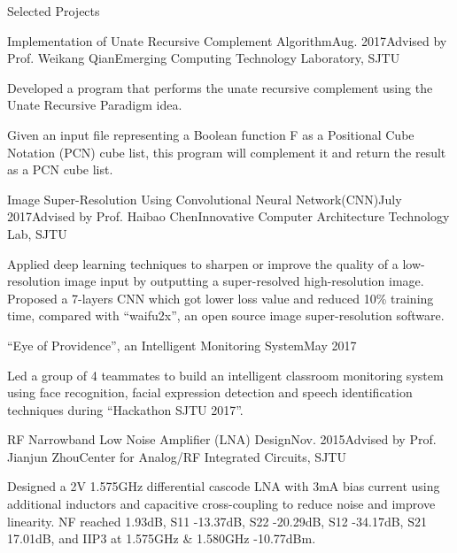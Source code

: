 \documentclass{resume_Stanford} %
\begin{document}
\begin{rSection}{Selected Projects}
\begin{rSubsection}{Implementation of Unate Recursive Complement Algorithm}{Aug. 2017}{Advised by Prof. Weikang Qian}{Emerging Computing Technology Laboratory, SJTU}
\item Developed a program that performs the unate recursive complement using the Unate Recursive Paradigm idea.
\item Given an input file representing a Boolean function F as a Positional Cube Notation (PCN) cube list, this program will complement it and return the result as a PCN cube list.
\end{rSubsection}

\begin{comment}
\begin{rSubsection}{Reading Combinational Circuit and Evaluating Its Outputs}{July 2017}{Advised by Prof. Weikang Qian}{Emerging Computing Technology Laboratory, SJTU}
\item Designed a software tool which can read "bench" format file describing a combinational circuit and implemented a topological sorting algorithm to calculate the values for all the primary outputs of the circuits.
\end{rSubsection}
\end{comment}

\begin{rSubsection}{Image Super-Resolution Using Convolutional Neural Network(CNN)}{July 2017}{Advised by Prof. Haibao Chen}{Innovative Computer Architecture Technology Lab, SJTU}
\item Applied deep learning techniques to sharpen or improve the quality of a low-resolution image input by outputting a super-resolved high-resolution image. Proposed a 7-layers CNN which got lower loss value and reduced 10\% training time, compared with ``waifu2x'', an open source image super-resolution software.
\end{rSubsection}

\begin{rSubsection}{``Eye of Providence'', an Intelligent Monitoring System}{May 2017}{}{}
\item Led a group of 4 teammates to build an intelligent classroom monitoring system using face recognition, facial expression detection and speech identification techniques during ``Hackathon SJTU 2017''.
\end{rSubsection}

\begin{rSubsection}{RF Narrowband Low Noise Amplifier (LNA) Design}{Nov. 2015}{Advised by Prof. Jianjun Zhou}{Center for Analog/RF Integrated Circuits, SJTU}
\item Designed a 2V 1.575GHz differential cascode LNA with 3mA bias current using additional inductors and
capacitive cross-coupling to reduce noise and improve linearity. NF reached 1.93dB, S11 -13.37dB, S22 -20.29dB, S12 -34.17dB, S21 17.01dB, and IIP3 at 1.575GHz \& 1.580GHz  -10.77dBm.
\end{rSubsection}


\end{rSection}
\end{document}
